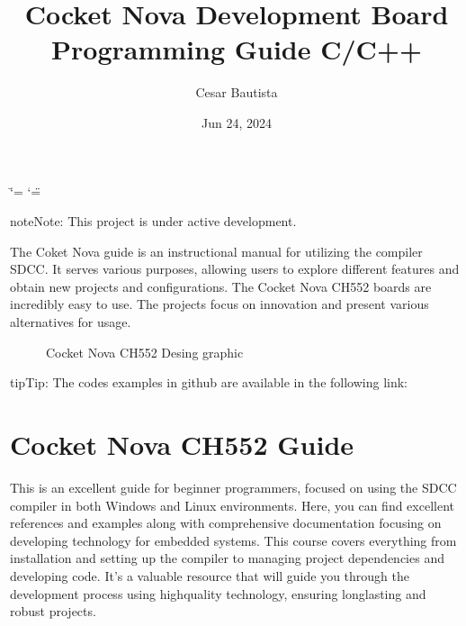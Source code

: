 \documentclass[letterpaper,10pt,english]{sphinxmanual}
\title{Cocket Nova Development Board Programming Guide C/C++}
\date{Jun 24, 2024}
\author{Cesar Bautista}
\begin{document}
\ifdefined\shorthandoff
  \ifnum\catcode`\=\string=\active\shorthandoff{=}\fi
  \ifnum\catcode`\"=\active{}\fi
\fi

\pagestyle{empty}
\sphinxmaketitle
\pagestyle{plain}
\sphinxtableofcontents
\pagestyle{normal}
\label{\detokenize{index::doc}}


\begin{sphinxadmonition}{note}{Note:}
\sphinxAtStartPar
This project is under active development.
\end{sphinxadmonition}

\sphinxAtStartPar
The Coket Nova guide is an instructional manual for utilizing the compiler SDCC. It serves various purposes, allowing users to explore different features and obtain new projects and
configurations.
The Cocket Nova CH552 boards are incredibly easy to use. The projects focus on innovation and
present various alternatives for usage.

\begin{figure}[htbp]
\centering
\capstart

\noindent{}
\caption{Cocket Nova CH552 Desing graphic}\label{\detokenize{index:id1}}\label{\detokenize{index:ch552}}\end{figure}

\begin{sphinxadmonition}{tip}{Tip:}
\sphinxAtStartPar
The codes examples in github are available in the following link: 
\end{sphinxadmonition}

\sphinxstepscope


\chapter{Cocket Nova CH552 Guide}
\label{\detokenize{about:cocket-nova-ch552-guide}}\label{\detokenize{about::doc}}
\sphinxAtStartPar
This is an excellent guide for beginner programmers, focused on using the SDCC compiler in both Windows and Linux environments.
Here, you can find excellent references and examples along with comprehensive documentation focusing on developing technology for embedded systems.
This course covers everything from installation and setting up the compiler to managing project dependencies and developing code. It’s a valuable resource that will guide you through the development process using high\sphinxhyphen{}quality technology, ensuring long\sphinxhyphen{}lasting and robust projects.
\end{document}
